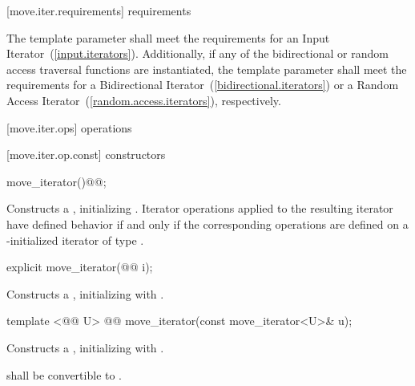 \begin{removedblock}
[move.iter.requirements]{ requirements}

\pnum
The template parameter  shall meet
the requirements for an Input Iterator~(\ref{input.iterators}).
Additionally, if any of the bidirectional or random access traversal
functions are instantiated, the template parameter shall meet the
requirements for a Bidirectional Iterator~(\ref{bidirectional.iterators})
or a Random Access Iterator~(\ref{random.access.iterators}), respectively.
\end{removedblock}

[move.iter.ops]{ operations}

[move.iter.op.const]{ constructors}

%
\begin{itemdecl}
move_iterator()@@;
\end{itemdecl}

\begin{itemdescr}
\pnum
\effects Constructs a , 
initializing . Iterator operations applied to the resulting
iterator have defined behavior if and only if the corresponding operations are defined
on a -initialized iterator of type .
\end{itemdescr}


%
\begin{itemdecl}
explicit move_iterator(@@ i);
\end{itemdecl}

\begin{itemdescr}
\pnum
\effects Constructs a , initializing
 with .
\end{itemdescr}


%
\begin{itemdecl}
template <@@ U>
  @@
move_iterator(const move_iterator<U>& u);
\end{itemdecl}

\begin{itemdescr}
\pnum
\effects Constructs a , initializing
 with .

\begin{removedblock}
\pnum
\requires {} shall be convertible to
.
\end{removedblock}
\end{itemdescr}

